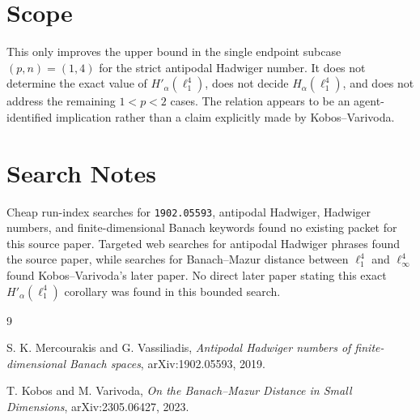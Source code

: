 \documentclass[11pt]{article}
\newcommand{\Ha}{H_\alpha}
\newcommand{\Hap}{H'_\alpha}
\begin{document}
\section*{Scope}

This only improves the upper bound in the single endpoint subcase
\((p,n)=(1,4)\) for the strict antipodal Hadwiger number.  It does not
determine the exact value of \(\Hap(\ell_1^4)\), does not decide
\(\Ha(\ell_1^4)\), and does not address the remaining \(1<p<2\) cases.
The relation appears to be an agent-identified implication rather than a
claim explicitly made by Kobos--Varivoda.

\section*{Search Notes}

Cheap run-index searches for \texttt{1902.05593}, antipodal Hadwiger,
Hadwiger numbers, and finite-dimensional Banach keywords found no existing
packet for this source paper.  Targeted web searches for antipodal Hadwiger
phrases found the source paper, while searches for Banach--Mazur distance
between \(\ell_1^4\) and \(\ell_\infty^4\) found Kobos--Varivoda's later
paper.  No direct later paper stating this exact \(\Hap(\ell_1^4)\) corollary
was found in this bounded search.

\begin{thebibliography}{9}

S. K. Mercourakis and G. Vassiliadis,
\emph{Antipodal Hadwiger numbers of finite-dimensional Banach spaces},
arXiv:1902.05593, 2019.

T. Kobos and M. Varivoda,
\emph{On the Banach--Mazur Distance in Small Dimensions},
arXiv:2305.06427, 2023.

\end{thebibliography}
\end{document}
